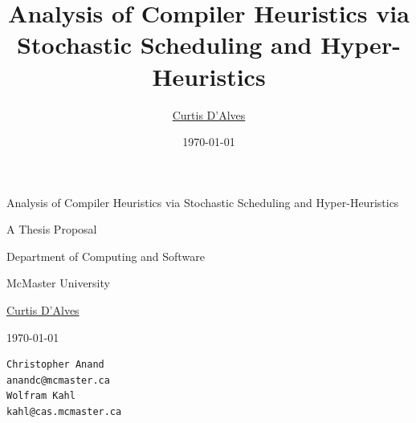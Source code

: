 \documentclass[12pt]{report}
\author{\href{mailto:dalvescb@mcmaster.ca}{Curtis D'Alves}}
\date{\today}
\title{Analysis of Compiler Heuristics via Stochastic Scheduling and Hyper-Heuristics}
\def\mytitle{??? Program Code ???}
\begin{document}
\def\labelitemi{$\diamond$}
\def\labelitemii{$\circ$}
\def\labelitemiii{$\star$}

%

\begin{center}


\thispagestyle{empty}

{\color{white}{.}}

\vspace{5em}

{\Huge Analysis of Compiler Heuristics via Stochastic Scheduling and Hyper-Heuristics}

\vspace{1em}

{\Large A Thesis Proposal}

\vspace{2em}

Department of Computing and Software

McMaster University

\vspace{2em}
\href{mailto:curtis.dalves@gmail.com}{Curtis D'Alves}

\vspace{2em}
\today

\vfill

\def\mytitle{{\sc Thesis Proposal \hspace{12em} \color{grey}{.} }}
\begin{verbatim}
Christopher Anand                                    anandc@mcmaster.ca
Wolfram Kahl                                         kahl@cas.mcmaster.ca
\end{verbatim}
\end{center}
\end{document}
